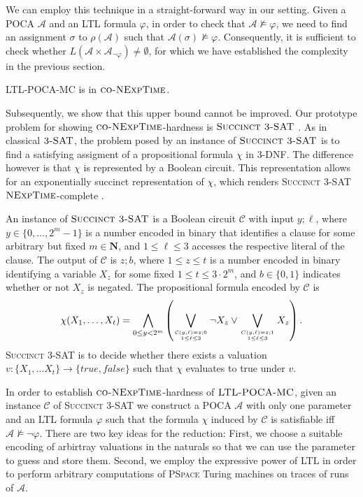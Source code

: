 \documentclass{llncs}
\newcommand{\naturals}{\ensuremath{\mathbf{N}}}
\newcommand{\automaton}{\ensuremath{\mathcal{A}}}
\newcommand{\circuit}{\ensuremath{\mathcal{C}}}
\newcommand{\poca}{\textsc{POCA} }
\newcommand{\stsat}{\textsc{Succinct 3-SAT} }
\newcommand{\tsat}{\textsc{3-SAT} }
\newcommand{\ltlpoca}{\textsc{LTL-POCA-MC} }
\newcommand{\nexptime}{\textsc{NExpTime} }
\newcommand{\conexptime}{\textsc{co-NExpTime} }
\newcommand{\pspace}{\textsc{PSpace} }
\newcommand{\true}{\ensuremath{\mathit{true}}}
\newcommand{\false}{\ensuremath{\mathit{false}}}
\newcommand{\defemph}[1]{\emph{#1}}
\begin{document}
We can employ this technique in a straight-forward way in our
setting. Given a \poca $\automaton$ and an LTL formula $\varphi$, in
order to check that $\automaton \not \models \varphi$, we need to find
an assignment $\sigma$ to $\rho(\automaton)$ such that
$\automaton(\sigma)\not\models \varphi$. Consequently, it is
sufficient to check whether $L(\automaton \times \automaton_{\neg
\varphi}) \neq \emptyset$, for which we have established the
complexity in the previous section.
\begin{proposition}
  \ltlpoca is in $\conexptime$.
\end{proposition}
Subsequently, we show that this upper bound cannot be improved.
Our prototype problem for showing $\conexptime$-hardness is $\stsat$
\cite{P94-book}. As in classical $\tsat$, the problem posed by an
instance of $\stsat$ is to find a satisfying assigment of a
propositional formula $\chi$ in 3-DNF. The difference however is that
$\chi$ is represented by a Boolean circuit. This representation allows
for an exponentially succinct representation of $\chi$, which renders
\stsat $\nexptime$-complete \cite{P94-book}.
\begin{definition}[\stsat]
  An instance of \defemph{$\stsat$} is a Boolean circuit $\circuit$
  with input $y;\ell$, where $y\in \{0, \ldots, 2^m-1\}$ is a number
  encoded in binary that identifies a clause for some arbitrary but
  fixed $m\in\naturals$, and $1\le \ell\le 3$ accesses the respective
  literal of the clause. The output of $\circuit$ is $z;b$, where
  $1\le z\le t$ is a number encoded in binary identifying a variable
  $X_z$ for some fixed $1\le t\le 3\cdot 2^m$, and $b\in\{0,1\}$
  indicates whether or not $X_z$ is negated. The propositional formula
  encoded by $\circuit$ is
  \begin{equation*}
    \chi(X_1,\ldots,X_t) = \bigwedge_{0\le y<2^m}\left(
    \bigvee_{\circuit(y,\ell)=z;0\atop 1\le \ell\le 3} \neg X_z
    \vee \bigvee_{C(y,\ell)=z;1\atop 1\le \ell \le 3} X_z \right).
  \end{equation*}
  \stsat is to decide whether there exists a valuation $v: \{X_1,
  \ldots X_{t}\}\to \{\true, \false\}$ such that $\chi$ evaluates to
  true under $v$.
\end{definition}
In order to establish $\conexptime$-hardness of $\ltlpoca$, given an
instance $\circuit$ of \stsat we construct a \poca $\automaton$ with
only one parameter and an LTL formula $\varphi$ such that the formula
$\chi$ induced by $\circuit$ is satisfiable iff $\automaton
\not\models \neg\varphi$. There are two key ideas for the reduction:
First, we choose a suitable encoding of arbirtray valuations in the
naturals so that we can use the parameter to guess and store
them. Second, we employ the expressive power of LTL in order to
perform arbitrary computations of \pspace Turing machines on traces of
runs of $\automaton$.
\end{document}
